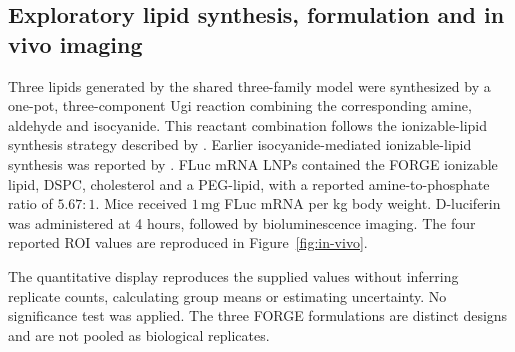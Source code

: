 \subsection{Exploratory lipid synthesis, formulation and in vivo imaging}
\label{app:in-vivo-methods}

Three lipids generated by the shared three-family model were synthesized by a one-pot,
three-component Ugi reaction combining the corresponding amine, aldehyde and isocyanide. This
reactant combination follows the ionizable-lipid synthesis strategy described by
\citet{chen2023muscle}. Earlier isocyanide-mediated ionizable-lipid synthesis was reported by
\citet{miao2019heterocyclic}.
FLuc mRNA LNPs contained the FORGE ionizable lipid, DSPC, cholesterol and a PEG-lipid, with a
reported amine-to-phosphate ratio of $5.67:1$. Mice received $1\,\mathrm{mg}$ FLuc mRNA per kg
body weight. D-luciferin was administered at 4 hours, followed by bioluminescence imaging.
The four reported ROI values are reproduced in Figure~\ref{fig:in-vivo}.

The quantitative display reproduces the supplied values without inferring replicate counts,
calculating group means or estimating uncertainty. No significance test was applied. The three
FORGE formulations are distinct designs and are not pooled as biological replicates.

